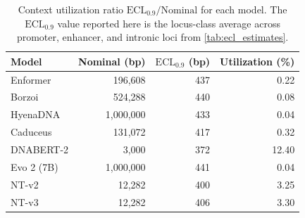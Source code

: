 \begin{table}[t]
\centering
\caption{Context utilization ratio $\mathrm{ECL}_{0.9} / \text{Nominal}$ for each model. The $\mathrm{ECL}_{0.9}$ value reported here is the locus-class average across promoter, enhancer, and intronic loci from \cref{tab:ecl_estimates}.}
\label{tab:utilization}
\begin{tabular}{lrrr}
\toprule
Model & Nominal (bp) & $\mathrm{ECL}_{0.9}$ (bp) & Utilization (\%) \\
\midrule
Enformer & 196,608 & 437 & 0.22 \\
Borzoi & 524,288 & 440 & 0.08 \\
HyenaDNA & 1,000,000 & 433 & 0.04 \\
Caduceus & 131,072 & 417 & 0.32 \\
DNABERT-2 & 3,000 & 372 & 12.40 \\
Evo 2 (7B) & 1,000,000 & 441 & 0.04 \\
NT-v2 & 12,282 & 400 & 3.25 \\
NT-v3 & 12,282 & 406 & 3.30 \\
\bottomrule
\end{tabular}
\end{table}
